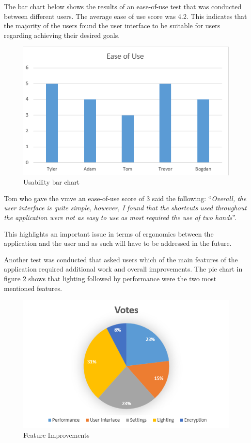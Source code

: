 \documentclass[11pt]{article}
\begin{document}
The bar chart below shows the results of an ease-of-use test that was conducted
between different users. The average ease of use score was 4.2. This indicates
that the majority of the users found the user interface to be suitable for users
regarding achieving their desired goals.

\begin{figure}[H]
  \centering
  \includegraphics[width=\textwidth]{images/bar_chart_usability.png}
  \caption{Usability bar chart}
  \label{fig:bar_chart_usability}
\end{figure}

Tom who gave the \gls*{vmve} an ease-of-use score of 3 said the following:
``\textit{Overall, the user interface is quite simple, however, I found that 
the shortcuts used throughout the application were not as easy to use as most
required the use of two hands}''. 

This highlights an important issue in terms of ergonomics between the
application and the user and as such will have to be addressed in the future.

Another test was conducted that asked users which of the main features of the
application required additional work and overall improvements. The pie chart in
figure \ref{fig:pie_chart_features} shows that lighting followed by performance
were the two most mentioned features.

\begin{figure}[H]
  \centering
  \includegraphics[width=\textwidth]{images/pie_chart_feature_improvements.png}
  \caption{Feature Improvements}
  \label{fig:pie_chart_features}
\end{figure}
\end{document}
